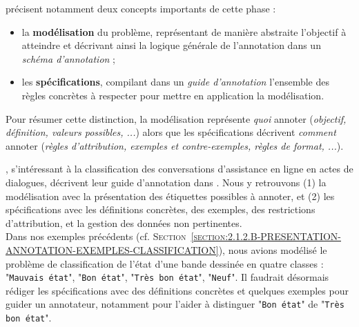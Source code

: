 			\cite{pustejovsky-stubbs:2012:natural-language-annotation} précisent notamment deux concepts importants de cette phase :
			\begin{itemize}
				\item la \textbf{modélisation} du problème, représentant de manière abstraite l'objectif à atteindre et décrivant ainsi la logique générale de l'annotation dans un \textit{schéma d'annotation} ;
				\item les \textbf{spécifications}, compilant dans un \textit{guide d'annotation} l'ensemble des règles concrètes à respecter pour mettre en application la modélisation.
			\end{itemize}
			Pour résumer cette distinction, la modélisation représente \textit{quoi} annoter (\textit{objectif, définition, valeurs possibles, ...}) alors que les spécifications décrivent \textit{comment} annoter (\textit{règles d'attribution, exemples et contre-exemples, règles de format, ...}).
			\begin{leftBarExamples}
				\cite{perrotin-etal:2018:annotation-actes-dialogue}, s'intéressant à la classification des conversations d'assistance en ligne en actes de dialogues, décrivent leur guide d'annotation dans \cite{asher-etal:2017:manuel-annotation-actes}.
				Nous y retrouvons (1) la modélisation avec la présentation des étiquettes possibles à annoter, et (2) les spécifications avec les définitions concrètes, des exemples, des restrictions d'attribution, et la gestion des données non pertinentes. \\
				Dans nos exemples précédents (cf. \textsc{Section~\ref{section:2.1.2.B-PRESENTATION-ANNOTATION-EXEMPLES-CLASSIFICATION}}), nous avions modélisé le problème de classification de l'état d'une bande dessinée en quatre classes : "\texttt{Mauvais état}", "\texttt{Bon état}", "\texttt{Très bon état}", "\texttt{Neuf}".
				Il faudrait désormais rédiger les spécifications avec des définitions concrètes et quelques exemples  pour guider un annotateur, notamment pour l'aider à distinguer "\texttt{Bon état}" de "\texttt{Très bon état}".
			\end{leftBarExamples}
			
